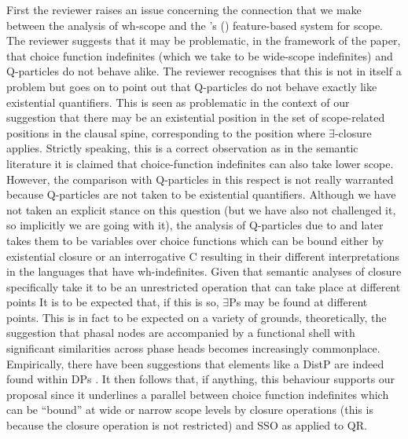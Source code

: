 \documentclass[11pt]{article}
\newcommand{\citeposs}[1]{\citeauthor{#1}'s (\citeyear{#1})}
\begin{document}
First the reviewer raises an issue concerning the connection that we make between the analysis of wh-scope and the \citeposs{Beghelli-Stowell97} feature-based system for scope.  The reviewer suggests that it may be problematic, in the framework of the paper, that choice function indefinites (which we take to be wide-scope indefinites) and Q-particles do not behave alike.  The reviewer recognises that this is not in itself a problem but goes on to point out that  Q-particles do not behave exactly like  existential quantifiers.  This is seen as problematic in the context of our suggestion \citep[modelled on]['s work]{kratzer:05} that there may be an existential position in the set of scope-related positions in the clausal spine, corresponding to the position where  $\exists$-closure applies.  Strictly speaking, this is a correct observation as in the semantic literature it is claimed that choice-function indefinites can also take lower scope.  However, the comparison with Q-particles in this respect is not really warranted because Q-particles are not taken to be existential quantifiers.  Although we have not taken an explicit stance on this question (but we have also not challenged it, so implicitly we are going with it), the analysis of Q-particles due to \citet{hagstrom:1998} and later \citet{cable:2007} takes them to be variables over choice functions which can be bound either by existential closure or an interrogative C resulting in their different interpretations in the languages that have wh-indefinites.   Given that semantic analyses of closure specifically take it to be an unrestricted operation that can take place at different points \citep[see most importantly,][and subsequent work]{Reinhart:1997,winter:1997a}  It is to be expected that, if this is so, $\exists$Ps may be found at different points. This is in fact to be expected on a variety of grounds, theoretically, the suggestion that phasal nodes are accompanied by a functional shell with significant similarities across phase heads becomes increasingly commonplace.  Empirically, there have been suggestions that elements like a DistP are indeed found within DPs \citep[e.g.][]{etxepare:14,tsoulas-woods:15}. It then follows that, if anything, this behaviour supports our proposal since it underlines a parallel between choice function indefinites which can be ``bound'' at wide or narrow scope levels by closure operations (this is because the closure operation is not restricted) and SSO as applied to QR.
\end{document}
